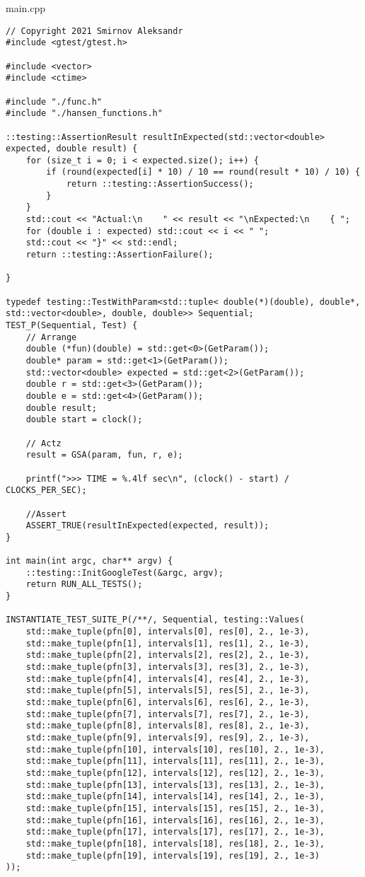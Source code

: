 \documentclass{report}
\begin{document}
main.cpp
\begin{lstlisting}
// Copyright 2021 Smirnov Aleksandr
#include <gtest/gtest.h>

#include <vector>
#include <ctime>

#include "./func.h"
#include "./hansen_functions.h"

::testing::AssertionResult resultInExpected(std::vector<double> expected, double result) {
    for (size_t i = 0; i < expected.size(); i++) {
        if (round(expected[i] * 10) / 10 == round(result * 10) / 10) {
            return ::testing::AssertionSuccess();
        }
    }
    std::cout << "Actual:\n    " << result << "\nExpected:\n    { ";
    for (double i : expected) std::cout << i << " ";
    std::cout << "}" << std::endl;
    return ::testing::AssertionFailure();

}

typedef testing::TestWithParam<std::tuple< double(*)(double), double*, std::vector<double>, double, double>> Sequential;
TEST_P(Sequential, Test) {
    // Arrange
    double (*fun)(double) = std::get<0>(GetParam());
    double* param = std::get<1>(GetParam());
    std::vector<double> expected = std::get<2>(GetParam());
    double r = std::get<3>(GetParam());
    double e = std::get<4>(GetParam());
    double result;
    double start = clock();

    // Actz
    result = GSA(param, fun, r, e);

    printf(">>> TIME = %.4lf sec\n", (clock() - start) / CLOCKS_PER_SEC);

    //Assert
    ASSERT_TRUE(resultInExpected(expected, result));
}

int main(int argc, char** argv) {
    ::testing::InitGoogleTest(&argc, argv);
    return RUN_ALL_TESTS();
}

INSTANTIATE_TEST_SUITE_P(/**/, Sequential, testing::Values(
    std::make_tuple(pfn[0], intervals[0], res[0], 2., 1e-3),
    std::make_tuple(pfn[1], intervals[1], res[1], 2., 1e-3),
    std::make_tuple(pfn[2], intervals[2], res[2], 2., 1e-3),
    std::make_tuple(pfn[3], intervals[3], res[3], 2., 1e-3),
    std::make_tuple(pfn[4], intervals[4], res[4], 2., 1e-3),
    std::make_tuple(pfn[5], intervals[5], res[5], 2., 1e-3),
    std::make_tuple(pfn[6], intervals[6], res[6], 2., 1e-3),
    std::make_tuple(pfn[7], intervals[7], res[7], 2., 1e-3),
    std::make_tuple(pfn[8], intervals[8], res[8], 2., 1e-3),
    std::make_tuple(pfn[9], intervals[9], res[9], 2., 1e-3),
    std::make_tuple(pfn[10], intervals[10], res[10], 2., 1e-3),
    std::make_tuple(pfn[11], intervals[11], res[11], 2., 1e-3),
    std::make_tuple(pfn[12], intervals[12], res[12], 2., 1e-3),
    std::make_tuple(pfn[13], intervals[13], res[13], 2., 1e-3),
    std::make_tuple(pfn[14], intervals[14], res[14], 2., 1e-3),
    std::make_tuple(pfn[15], intervals[15], res[15], 2., 1e-3),
    std::make_tuple(pfn[16], intervals[16], res[16], 2., 1e-3),
    std::make_tuple(pfn[17], intervals[17], res[17], 2., 1e-3),
    std::make_tuple(pfn[18], intervals[18], res[18], 2., 1e-3),
    std::make_tuple(pfn[19], intervals[19], res[19], 2., 1e-3)
));
\end{lstlisting}
\end{document}
